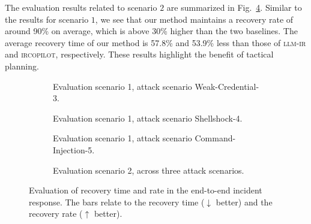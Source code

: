 \documentclass[runningheads,10pt]{llncs}
\begin{document}
The evaluation results related to scenario $2$ are summarized in Fig.~\ref{fig:recovery-system-3-4-5}. Similar to the results for scenario $1$, we see that our method maintains a recovery rate of around 90\% on average, which is above 30\% higher than the two baselines. The average recovery time of our method is 57.8\% and 53.9\% less than those of \textsc{llm-ir} and \textsc{ircopilot}, respectively. These results highlight the benefit of tactical planning.  
\begin{figure}[!ht]

\centering
\begin{subfigure}{0.495\linewidth}
\centering
\makebox[\linewidth][c]{%
  \resizebox{1.03\linewidth}{!}{}%
}
\par
{}
\caption{Evaluation scenario 1, attack scenario Weak-Credential-3. }
\label{fig:recovery-time-3}    
\end{subfigure}\hfill%
\begin{subfigure}{0.495\linewidth}
\centering
\makebox[\linewidth][c]{%
  \resizebox{1.03\linewidth}{!}{}%
}
\par
{}
\caption{Evaluation scenario 1, attack scenario Shellshock-4.}
\label{fig:recovery-time-4}    
\end{subfigure}
\par\medskip

\begin{subfigure}[t]{0.495\linewidth}
\centering
\makebox[\linewidth][c]{%
  \resizebox{1.03\linewidth}{!}{}%
}
\par
{}
\caption{Evaluation scenario 1, attack scenario Command-Injection-5.}
\label{fig:recovery-time-5}  
\end{subfigure}\hfill%
\begin{subfigure}[t]{0.495\linewidth}
\centering
\makebox[\linewidth][c]{%
  \resizebox{1.03\linewidth}{!}{}%
}
\par
{}
\caption{Evaluation scenario 2, across three attack scenarios.}
\label{fig:recovery-system-3-4-5}   
\end{subfigure}
\caption{Evaluation of recovery time and rate in the end-to-end incident response. The bars relate to the recovery time ($\downarrow$ better) and the recovery rate ($\uparrow$ better).}
\label{fig:time-rate}
\end{figure}
\end{document}
